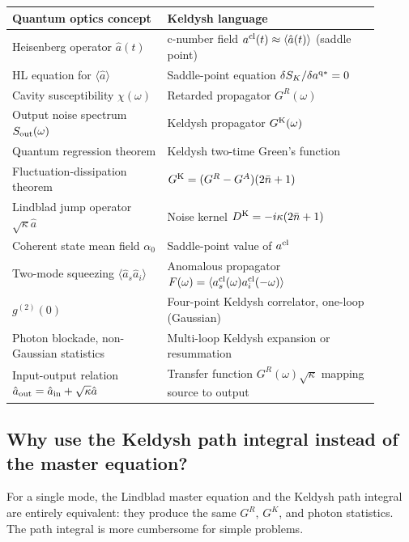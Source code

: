 \documentclass[12pt]{article}
\newcommand{\cl}{{\rm cl}}
\newcommand{\q}{{\rm q}}
\newcommand{\Keldysh}{{\rm K}}
\begin{document}
\begin{center}
\begin{tabular}{p{0.38\linewidth}p{0.52\linewidth}}
\toprule
Quantum optics concept & Keldysh language \\
\midrule
Heisenberg operator $\hat{a}(t)$ &
  c-number field $a^\cl(t) \approx \langle\hat{a}(t)\rangle$ (saddle point) \\[3pt]
HL equation for $\langle\hat{a}\rangle$ &
  Saddle-point equation $\delta S_K/\delta a^{\q*} = 0$ \\[3pt]
Cavity susceptibility $\chi(\omega)$ &
  Retarded propagator $G^R(\omega)$ \\[3pt]
Output noise spectrum $S_{\rm out}(\omega)$ &
  Keldysh propagator $G^\Keldysh(\omega)$ \\[3pt]
Quantum regression theorem &
  Keldysh two-time Green's function \\[3pt]
Fluctuation-dissipation theorem &
  $G^\Keldysh = (G^R - G^A)(2\bar{n}+1)$ \\[3pt]
Lindblad jump operator $\sqrt{\kappa}\hat{a}$ &
  Noise kernel $D^\Keldysh = -i\kappa(2\bar{n}+1)$ \\[3pt]
Coherent state mean field $\alpha_0$ &
  Saddle-point value of $a^\cl$ \\[3pt]
Two-mode squeezing $\langle\hat{a}_s\hat{a}_i\rangle$ &
  Anomalous propagator $F(\omega) = \langle a^\cl_s(\omega) a^\cl_i(-\omega)\rangle$ \\[3pt]
$g^{(2)}(0)$ &
  Four-point Keldysh correlator, one-loop (Gaussian) \\[3pt]
Photon blockade, non-Gaussian statistics &
  Multi-loop Keldysh expansion or resummation \\[3pt]
Input-output relation $\hat{a}_{\rm out} = \hat{a}_{\rm in} + \sqrt{\kappa}\hat{a}$ &
  Transfer function $G^R(\omega)\sqrt{\kappa}$ mapping source to output \\
\bottomrule
\end{tabular}
\end{center}

\subsection{Why use the Keldysh path integral instead of the master
equation?}

For a single mode, the Lindblad master equation and the Keldysh path
integral are entirely equivalent: they produce the same $G^R$, $G^K$,
and photon statistics.  The path integral is more cumbersome for simple
problems.
\end{document}
